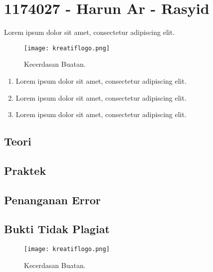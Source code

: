 \section{1174027 - Harun Ar - Rasyid}
Lorem ipsum dolor sit amet, consectetur adipiscing elit.


\hfill\break
\begin{figure}[H]
    \texttt{[image: kreatiflogo.png]}
    \centering
    \caption{Kecerdasan Buatan.}
\end{figure}

\begin{enumerate}
	\item Lorem ipsum dolor sit amet, consectetur adipiscing elit.
	\item Lorem ipsum dolor sit amet, consectetur adipiscing elit.
	\item Lorem ipsum dolor sit amet, consectetur adipiscing elit.
\end{enumerate}

\subsection{Teori}

\subsection{Praktek}

\subsection{Penanganan Error}

\subsection{Bukti Tidak Plagiat}
\begin{figure}[H]
	\texttt{[image: kreatiflogo.png]}
	\centering
	\caption{Kecerdasan Buatan.}
\end{figure}